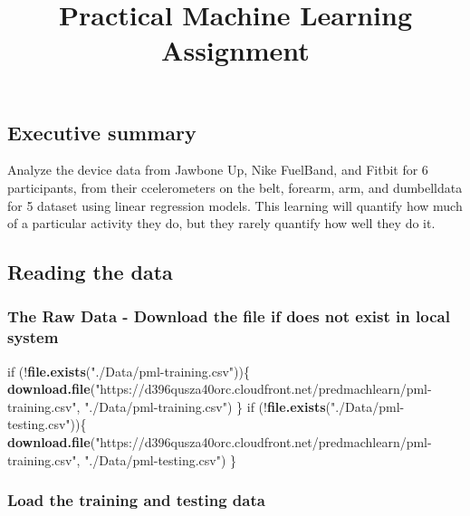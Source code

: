 \documentclass[]{article}
\title{Practical Machine Learning Assignment}
\author{}
\date{}
\newenvironment{Shaded}{\begin{snugshade}}{\end{snugshade}}
\newcommand{\KeywordTok}[1]{\textcolor[rgb]{0.13,0.29,0.53}{\textbf{{#1}}}}
\newcommand{\StringTok}[1]{\textcolor[rgb]{0.31,0.60,0.02}{{#1}}}
\newcommand{\NormalTok}[1]{{#1}}
\begin{document}
\maketitle


\subsection{Executive summary}\label{executive-summary}

Analyze the device data from Jawbone Up, Nike FuelBand, and Fitbit for 6
participants, from their ccelerometers on the belt, forearm, arm, and
dumbelldata for 5 dataset using linear regression models. This learning
will quantify how much of a particular activity they do, but they rarely
quantify how well they do it.

\subsection{Reading the data}\label{reading-the-data}

\subsubsection{The Raw Data - Download the file if does not exist in
local
system}\label{the-raw-data---download-the-file-if-does-not-exist-in-local-system}

\begin{Shaded}
\begin{Highlighting}[]
\NormalTok{if (!}\KeywordTok{file.exists}\NormalTok{(}\StringTok{"./Data/pml-training.csv"}\NormalTok{))\{}
  \KeywordTok{download.file}\NormalTok{(}\StringTok{"https://d396qusza40orc.cloudfront.net/predmachlearn/pml-training.csv"}\NormalTok{,}
                \StringTok{"./Data/pml-training.csv"}\NormalTok{)}
\NormalTok{\}}
\NormalTok{if (!}\KeywordTok{file.exists}\NormalTok{(}\StringTok{"./Data/pml-testing.csv"}\NormalTok{))\{}
  \KeywordTok{download.file}\NormalTok{(}\StringTok{"https://d396qusza40orc.cloudfront.net/predmachlearn/pml-training.csv"}\NormalTok{,}
                \StringTok{"./Data/pml-testing.csv"}\NormalTok{)}
\NormalTok{\}}
\end{Highlighting}
\end{Shaded}

\subsubsection{Load the training and testing
data}\label{load-the-training-and-testing-data}
\end{document}
